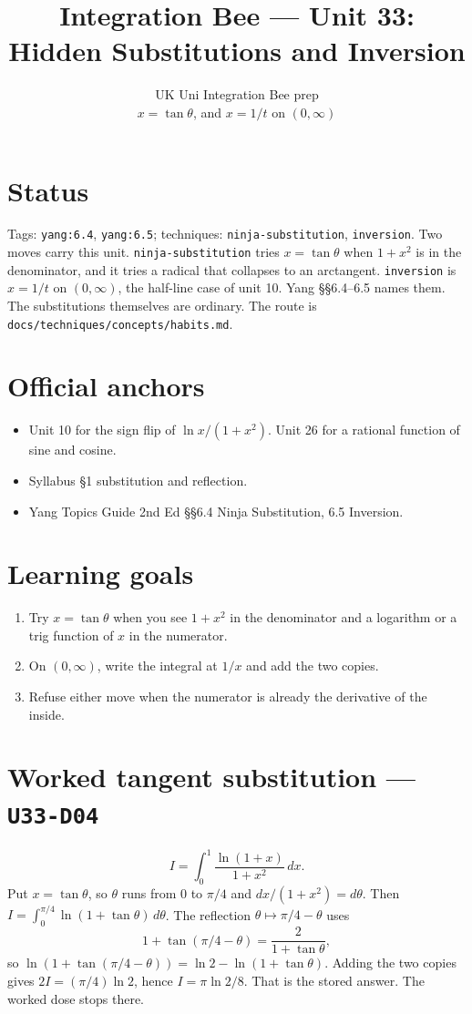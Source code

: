 
\title{Integration Bee --- Unit 33:\\ Hidden Substitutions and Inversion}
\author{UK Uni Integration Bee prep\\ $x=\tan\theta$, and $x=1/t$ on $(0,\infty)$}
\date{}

\maketitle
\section*{Status}
Tags: \texttt{yang:6.4}, \texttt{yang:6.5}; techniques: \texttt{ninja-substitution}, \texttt{inversion}.
Two moves carry this unit. \texttt{ninja-substitution} tries $x=\tan\theta$ when $1+x^2$ is in the denominator, and it tries a radical that collapses to an arctangent. \texttt{inversion} is $x=1/t$ on $(0,\infty)$, the half-line case of unit 10. Yang \S\S6.4--6.5 names them. The substitutions themselves are ordinary. The route is \texttt{docs/techniques/concepts/habits.md}.
\section{Official anchors}
\begin{itemize}
\item Unit 10 for the sign flip of $\ln x/(1+x^2)$. Unit 26 for a rational function of sine and cosine.
\item Syllabus \S1 substitution and reflection.
\item Yang Topics Guide 2nd Ed \S\S6.4 Ninja Substitution, 6.5 Inversion.
\end{itemize}
\section{Learning goals}
\begin{enumerate}
  \item Try $x=\tan\theta$ when you see $1+x^2$ in the denominator and a logarithm or a trig function of $x$ in the numerator.
  \item On $(0,\infty)$, write the integral at $1/x$ and add the two copies.
  \item Refuse either move when the numerator is already the derivative of the inside.
\end{enumerate}

\section{Worked tangent substitution --- \texttt{U33-D04}}
\[
I=\int_0^1\frac{\ln(1+x)}{1+x^2}\,dx.
\]
Put $x=\tan\theta$, so $\theta$ runs from $0$ to $\pi/4$ and $dx/(1+x^2)=d\theta$. Then $I=\int_0^{\pi/4}\ln(1+\tan\theta)\,d\theta$. The reflection $\theta\mapsto\pi/4-\theta$ uses
\[
1+\tan(\pi/4-\theta)=\frac{2}{1+\tan\theta},
\]
so $\ln(1+\tan(\pi/4-\theta))=\ln 2-\ln(1+\tan\theta)$. Adding the two copies gives $2I=(\pi/4)\ln 2$, hence $I=\pi\ln 2/8$. That is the stored answer. The worked dose stops there.

